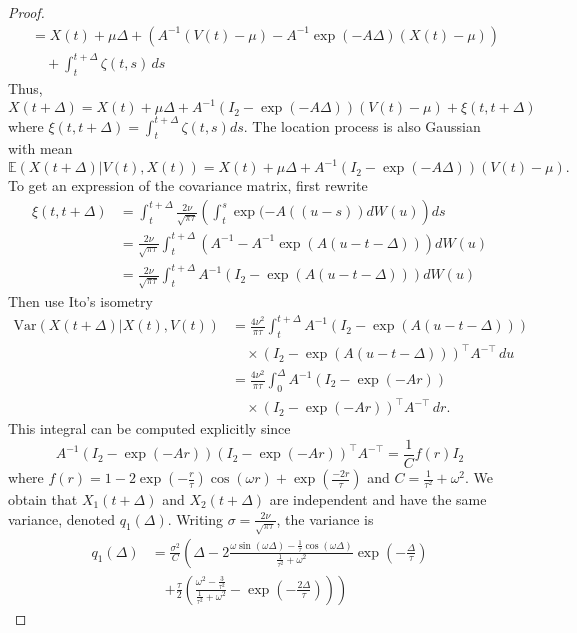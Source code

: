 \documentclass[aoas]{imsart}
\theoremstyle{definition}
\theoremstyle{remark}
\theoremstyle{remark}
\newcommand {\E}{\mathbb{E}}
\newcommand {\1}{\mathbb{1}}
\begin{document}
\begin{proof}
\begin{align*}
    &= X(t) + \mu \Delta + \left(A^{-1}(V(t) - \mu) - A^{-1}\exp(-A\Delta)(X(t) - \mu)\right) \\
    &\quad + \int_t^{t+\Delta} \zeta(t,s) \, ds
\end{align*}
	Thus, 
	\begin{equation}
		X(t+\Delta)=X(t)+\mu \Delta+A^{-1} \left( I_2-\exp(-A\Delta)\right)(V(t)-\mu)+\xi(t,t+\Delta) 
	\end{equation}
	where $ \xi(t,t+\Delta)=\int_t^{t+\Delta} \zeta(t,s)ds$.
	The location process is also Gaussian with mean 
	\begin{equation}
		\E(X(t+\Delta) \vert V(t),X(t)) =X(t)+\mu \Delta+A^{-1} \left( I_2-\exp(-A\Delta)\right)(V(t)-\mu).
	\end{equation}
	To get an expression of the covariance matrix, first rewrite
	\begin{align*}
		\xi(t,t+\Delta)&=\int_t^{t+\Delta} \frac{2 \nu}{\sqrt{\pi \tau}} \left( \int_t^s \exp(-A((u-s))dW(u) \right) ds \\
		&= \frac{2\nu}{\sqrt{\pi \tau}} \int_t^{t+\Delta} (A^{-1}-A^{-1}\exp(A(u-t-\Delta))) dW(u) \\
		&= \frac{2\nu}{\sqrt{\pi \tau}} \int_t^{t+\Delta} A^{-1}(I_2-\exp(A(u-t-\Delta))) dW(u)
	\end{align*}
	Then use Ito's isometry
 \begin{align*}
    \mbox{Var}(X(t+\Delta)\vert X(t),V(t))&=\frac{4 \nu^2}{\pi \tau} 
    \int_{t}^{t+\Delta} A^{-1} (I_2-\exp(A(u-t-\Delta)))\\
    &\quad \times (I_2-\exp(A(u-t-\Delta)))^\top A^{-\top} \, du \\
    &=\frac{4 \nu^2}{\pi \tau} \int_{0}^{\Delta} A^{-1} (I_2-\exp(-Ar))\\
    &\quad \times (I_2-\exp(-Ar))^\top A^{-\top} \, dr.
\end{align*}
This integral can be computed explicitly since 
\[A^{-1} (I_2-\exp(-Ar))(I_2-\exp(-Ar))^\top A^{-\top}=\frac{1}{C} f(r) I_2 \]
where $f(r)=1-2\exp\left( -\frac{r}{\tau}\right)\cos(\omega r)+\exp\left(\frac{-2r}{\tau}\right)$ and $C=\frac{1}{\tau^2}+\omega^2$.
We obtain that $X_1(t+\Delta)$ and $X_2(t+\Delta)$ are independent and have the same variance, denoted $q_1(\Delta)$.
Writing $\sigma=\frac{2\nu}{\sqrt{\pi \tau}}$, the variance is
\begin{align*}
    q_1(\Delta) &= \frac{\sigma^2}{C} \left( \Delta 
    - 2 \frac{\omega \sin(\omega \Delta) - \frac{1}{\tau} \cos(\omega \Delta)}{\frac{1}{\tau^2} + \omega^2 } 
    \exp\left( -\frac{\Delta}{\tau} \right) \right. \\
    &\quad \left. + \frac{\tau}{2} \left( \frac{\omega^2 - \frac{3}{\tau^2}}{\frac{1}{\tau^2} + \omega^2} 
    - \exp\left( -\frac{2\Delta}{\tau}\right) \right) 
    \right)
\end{align*}
	

\end{proof}
\end{document}
